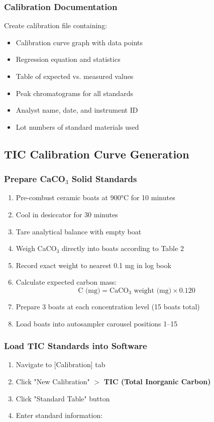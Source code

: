 \documentclass[11pt,a4paper]{article}\usepackage[]{graphicx}\usepackage[]{xcolor}
\begin{document}
\subsubsection{Calibration Documentation}
Create calibration file containing:
\begin{itemize}[noitemsep]
    \item Calibration curve graph with data points
    \item Regression equation and statistics
    \item Table of expected vs. measured values
    \item Peak chromatograms for all standards
    \item Analyst name, date, and instrument ID
    \item Lot numbers of standard materials used
\end{itemize}

\subsection{TIC Calibration Curve Generation}

\subsubsection{Prepare CaCO$_3$ Solid Standards}
\begin{enumerate}[noitemsep]
    \item Pre-combust ceramic boats at 900°C for 10 minutes
    \item Cool in desiccator for 30 minutes
    \item Tare analytical balance with empty boat
    \item Weigh CaCO$_3$ directly into boats according to Table 2
    \item Record exact weight to nearest 0.1 mg in log book
    \item Calculate expected carbon mass:
    \begin{equation}
    \text{C (mg)} = \text{CaCO}_3 \text{ weight (mg)} \times 0.120
    \end{equation}
    \item Prepare 3 boats at each concentration level (15 boats total)
    \item Load boats into autosampler carousel positions 1--15
\end{enumerate}

\subsubsection{Load TIC Standards into Software}
\begin{enumerate}[noitemsep]
    \item Navigate to [Calibration] tab
    \item Click "New Calibration" $>$ \textbf{TIC (Total Inorganic Carbon)}
    \item Click "Standard Table" button
    \item Enter standard information:
\end{enumerate}
\end{document}
